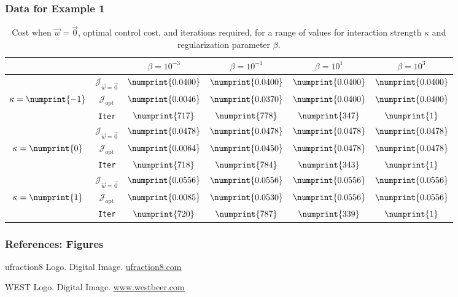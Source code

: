 \documentclass[aspectratio=169,xcolor=dvipsnames]{beamer}
\begin{document}
\begin{frame}
	\frametitle{Data for Example 1}
	\begin{table}
		\centering
		\begin{tabular}{ | c | c || c | c | c | c ||}
			\hline
			\multicolumn{2}{|c||}{}& $\beta = 10^{-3}$ & $\beta = 10^{-1}$ & $\beta = 10^{1}$ & $\beta = 10^{3}$  \\
			\hline
			\hline
			& $\mathcal J_{\vec{w} = \vec 0}$ & $\numprint{0.0400}$ & $\numprint{0.0400}$ & $\numprint{0.0400}$ & $\numprint{0.0400}$ \\
			$\kappa= \numprint{-1}$  & $\mathcal{J}_{\text{opt}}$ & $\numprint{0.0046}$ & $\numprint{0.0370}$ & $\numprint{0.0400}$ & $\numprint{0.0400}$ \\
			& \texttt{Iter} & $\numprint{717}$ & $\numprint{778}$ & $\numprint{347}$ & $\numprint{1}$ \\
			\hline
			& $\mathcal J_{\vec{w} = \vec 0}$ & $\numprint{0.0478}$ & $\numprint{0.0478}$ & $\numprint{0.0478}$ & $\numprint{0.0478}$ \\
			$\kappa= \numprint{0}$  & $\mathcal{J}_{\text{opt}}$ & $\numprint{0.0064}$ & $\numprint{0.0450}$ & $\numprint{0.0478}$ & $\numprint{0.0478}$ \\
			& \texttt{Iter} & $\numprint{718}$ & $\numprint{784}$ & $\numprint{343}$ & $\numprint{1}$ \\
			\hline
			& $\mathcal J_{\vec{w} = \vec 0}$ & $\numprint{0.0556}$ & $\numprint{0.0556}$ & $\numprint{0.0556}$ & $\numprint{0.0556}$ \\
			$\kappa= \numprint{1}$  & $\mathcal{J}_{\text{opt}}$ & $\numprint{0.0085}$ & $\numprint{0.0530}$ & $\numprint{0.0556}$ & $\numprint{0.0556}$ \\
			& \texttt{Iter} & $\numprint{720}$ & $\numprint{787}$ & $\numprint{339}$ & $\numprint{1}$ \\
			\hline
		\end{tabular}
		\caption{Cost when $\vec{w}=\vec{0}$, optimal control cost, and iterations required, for a range of values for interaction strength $\kappa$ and regularization parameter $\beta$.}
		\label{TabS5:Prob22D}
	\end{table}
\end{frame}


\begin{frame}
	\frametitle{References: Figures}   
	\begin{thebibliography}{10}    
		ufraction8 Logo. Digital Image. 
		\url{ufraction8.com}
		
		WEST Logo. Digital Image.  \url{www.westbeer.com}
	\end{thebibliography}	
\end{frame}
\end{document}
